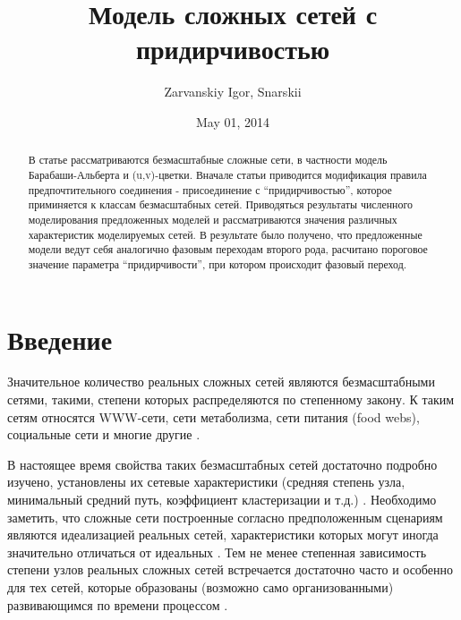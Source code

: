\documentclass[10pt,aps,pra]{revtex4-1}
\begin{document}
\title{Модель сложных сетей с придирчивостью}
\author{Zarvanskiy Igor, Snarskii}


\date{May 01, 2014}

\begin{abstract}
В статье рассматриваются безмасштабные сложные сети, в частности модель Барабаши-Альберта и (u,v)-цветки. Вначале статьи приводится модификация правила предпочтительного соединения - присоединение с ``придирчивостью'', которое приминяется к классам безмасштабных сетей. Приводяться результаты численного моделирования предложенных моделей и рассматриваются значения различных характеристик моделируемых сетей. В результате было получено, что предложенные модели ведут себя аналогично фазовым переходам второго рода, расчитано пороговое значение параметра ``придирчивости'', при котором происходит фазовый переход.
\end{abstract}

\maketitle

\linenumbers\par

\section{Введение}

Значительное количество реальных сложных сетей являются безмасштабными сетями, такими, степени которых распределяются по степенному закону. К таким сетям относятся WWW-сети, сети метаболизма, сети питания (food webs), социальные сети и многие другие \cite{Dor2}.

В настоящее время свойства таких безмасштабных сетей достаточно подробно изучено, установлены их сетевые характеристики (средняя степень узла, минимальный средний путь, коэффициент кластеризации и т.д.) \cite{Newman}. Необходимо заметить, что сложные сети построенные согласно предположенным сценариям \cite{AlBa2} являются идеализацией реальных сетей, характеристики которых могут иногда значительно отличаться от идеальных \cite{Newman}. Тем не менее степенная зависимость степени узлов реальных сложных сетей встречается достаточно часто и особенно для тех сетей, которые образованы (возможно само организованными) развивающимся по времени процессом \cite{}.
\end{document}
